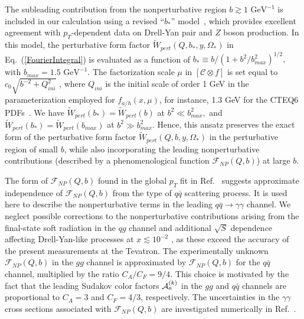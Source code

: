 \documentclass[12pt,english,aps,preprint,prd,letterpaper,fleqn,nofootinbib,showpacs,showkeys,tightenlines,floatfix]{revtex4}
\begin{document}
The subleading contribution from the nonperturbative region $b\gtrsim1\mbox{ GeV}^{-1}$
is included in our calculation using a revised {}``$b_{*}$'' model~\cite{Konychev:2005iy},
which provides excellent agreement with $p_{T}$-dependent data on Drell-Yan
pair and $Z$ boson production. In this model, the perturbative form
factor $\widetilde{W}_{pert}(Q,b_{*},y,\Omega_{*})$ in Eq.~(\ref{FourierIntegral})
is evaluated as a function of $b_{*}\equiv b/(1+b^{2}/b_{max}^{2})^{1/2},$
with $b_{max}=1.5\mbox{ GeV}^{-1}$. The factorization scale $\mu$
in $\left[{\mathcal{C}}\otimes f\right]$ is set equal to $c_{0}\sqrt{b^{-2}+Q_{ini}^{2}}$
, where $Q_{ini}$ is the initial scale of order 1 GeV in the parameterization
employed for $f_{a/h}(x,\mu)$, for instance, 1.3 GeV for the CTEQ6
PDFs~\cite{Pumplin:2002vw}. We have $\widetilde{W}_{pert}(b_{*})=\widetilde{W}_{pert}(b)$
at $b^{2}\ll b_{max}^{2},$ and $\widetilde{W}_{pert}(b_{*})=\widetilde{W}_{pert}(b_{max})$
at $b^{2}\gg b_{max}^{2}$. Hence, this ansatz preserves the exact
form of the perturbative form factor $\widetilde{W}_{pert}(Q,b,y,\Omega_{*})$
in the perturbative region of small $b$, while also incorporating
the leading nonperturbative contributions (described by a phenomenological
function $\mathcal{F}_{NP}(Q,b)$) at large $b$.

The form of $\mathcal{F}_{NP}(Q,b)$ found in the global $p_{T}$
fit in Ref.~\cite{Konychev:2005iy} suggests approximate independence
of $\mathcal{F}_{NP}(Q,b)$ from the type of $q\bar{q}$ scattering
process. It is used here to describe the nonperturbative terms in
the leading $q\bar{q}\rightarrow\gamma\gamma$ channel. We neglect
possible corrections to the nonperturbative contributions arising
from the final-state soft radiation in the $qg$ channel and additional
$\sqrt{S}$ dependence affecting Drell-Yan-like processes at $x\lesssim10^{-2}$
\cite{Berge:2004nt}, as these exceed the accuracy of the present
measurements at the Tevatron. The experimentally unknown $\mathcal{F}_{NP}(Q,b)$
in the $gg$ channel is approximated by $\mathcal{F}_{NP}(Q,b)$ for
the $q\bar{q}$ channel, multiplied by the ratio $C_{A}/C_{F}=9/4$.  This 
choice is motivated by the fact that the leading Sudakov color factors 
${\cal A}_a^{(k)}$ in
the $gg$ and $q\bar{q}$ channels are proportional to 
$C_{A}=3$ and $C_{F}=4/3$, respectively. 
The uncertainties in the $\gamma\gamma$
cross sections associated with $\mathcal{F}_{NP}(Q,b)$ are investigated
numerically in Ref.~\cite{Nadolsky:2007ba}.
\end{document}

